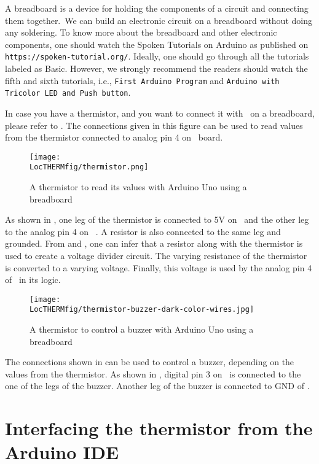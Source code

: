A breadboard is a device for holding the components of a circuit and connecting
them together. We can build an electronic circuit on a breadboard without doing any
soldering. To know more about the breadboard and other electronic components,
one should watch the Spoken Tutorials on Arduino as published on
  {\tt https://spoken-tutorial.org/}. Ideally, one should go through all the
tutorials labeled as Basic. However, we strongly recommend the readers should
watch the fifth and sixth tutorials, i.e., {\tt First Arduino Program} and
  {\tt Arduino with Tricolor LED and Push button}.

In case you have a thermistor, and you want to connect it with \arduino\ on a breadboard,
please refer to . The connections given in this figure
can be used to read values from the thermistor connected to analog pin 4 on \arduino\
board.
\begin{figure}
  \centering
  \texttt{[image: \\LocTHERMfig/thermistor.png]}
  \caption{A thermistor to read its values with Arduino Uno using a breadboard}
  \label{fig:ard-therm-bread}
\end{figure}
As shown in , one leg of the thermistor is connected
to 5V on \arduino\ and the other leg to the analog pin 4 on  \arduino. A resistor is also
connected to the same leg and grounded. From \figref{fig:therm-conn} and , one can infer that a resistor
along with the thermistor is used to create a voltage divider circuit. The varying
resistance of the thermistor is converted to a varying voltage. Finally, this voltage is used
by the analog pin 4 of \arduino\ in its logic.

\begin{figure}
  \centering
  \texttt{[image: \\LocTHERMfig/thermistor-buzzer-dark-color-wires.jpg]}
  \caption{A thermistor to control a buzzer with Arduino Uno using a breadboard}
  \label{fig:ard-therm-buzzer}
\end{figure}
The connections shown in  can be used to control a buzzer,
depending on the values from the thermistor. As shown in \figref{fig:ard-therm-buzzer},
digital pin 3 on \arduino\ is connected to the one of the legs of the buzzer. Another
leg of the buzzer is connected to GND of \arduino.


\section{Interfacing the thermistor from the Arduino IDE}
